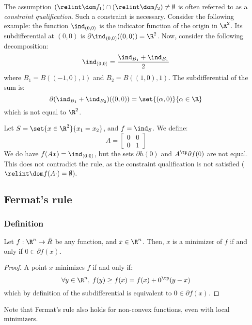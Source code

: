 \begin{remark}
    \label{rm:constraint-qualification}
    The assumption $(\relint\dom f_1)\cap (\relint\dom f_2)\neq\emptyset$ is often referred to as a \emph{constraint qualification}. Such a constraint is necessary. Consider the following example: the function $\ind_{(0,0)}$ is the indicator function of the origin in $\R^2$. Its subdifferential at $(0, 0)$ is $\partial\ind_{(0,0)}((0, 0)) = \R^2$. Now, consider the following decomposition:
    \begin{equation*}
        \ind_{(0, 0)} = \frac{\ind_{B_1} + \ind_{B_1}}{2}
    \end{equation*}
    where $B_1 = B((-1, 0), 1)$ and $B_2 = B((1, 0), 1)$. The subdifferential of the sum is:
    \begin{equation*}
        \partial(\ind_{B_1}+\ind_{B_2})((0, 0)) = \set{(\alpha, 0)}{\alpha\in\R}
    \end{equation*}
    which is not equal to $\R^2$.
\end{remark}

\begin{remark}
    Let $S=\set{x\in\R^2}{x_1=x_2}$, and $f=\ind_S$. We define:
    \begin{equation*}
        A = \begin{bmatrix}
            0 & 0\\
            0 & 1
        \end{bmatrix}
    \end{equation*}
    We do have $f(Ax)=\ind_{(0, 0)}$, but the sets $\partial h(0)$ and $A^\tp\partial f(0)$ are not equal. This does not contradict the rule, as the constraint qualification is not satisfied ($\relint\dom f(A\cdot)=\emptyset$).
\end{remark}

\subsection{Fermat's rule}
\subsubsection{Definition}
\begin{theorem}
    Let $f:\R^n\to\bar{R}$ be any function, and $x\in\R^n$. Then, $x$ is a minimizer of $f$ if and only if $0\in\partial f(x)$.
\end{theorem}
\begin{proof}
    A point $x$ minimizes $f$ if and only if:
    \begin{equation*}
        \forall y\in\R^n, \: f(y)\geq f(x) = f(x) + 0^\tp(y-x)
    \end{equation*}
    which by definition of the subdifferential is equivalent to $0\in\partial f(x)$.
\end{proof}
Note that Fermat's rule also holds for non-convex functions, even with local minimizers.

